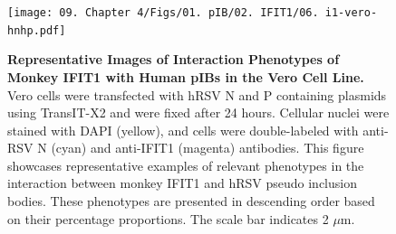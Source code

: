 \begin{figure}
    \centering
    \texttt{[image: 09. Chapter 4/Figs/01. pIB/02. IFIT1/06. i1-vero-hnhp.pdf]}
    \caption[Representative Images of Interaction Phenotypes of Monkey IFIT1 with Human pIBs in the Vero Cell Line.]{\textbf{Representative Images of Interaction Phenotypes of Monkey IFIT1 with Human pIBs in the Vero Cell Line.} Vero cells were transfected with hRSV N and P containing plasmids using TransIT-X2 and were fixed after 24 hours. Cellular nuclei were stained with DAPI (yellow), and cells were double-labeled with anti-RSV N (cyan) and anti-IFIT1 (magenta) antibodies. This figure showcases representative examples of relevant phenotypes in the interaction between monkey IFIT1 and hRSV pseudo inclusion bodies. These phenotypes are presented in descending order based on their percentage proportions. The scale bar indicates 2 \(\mu \mbox{m}\).}
    \label{fig:Representative Images of Interaction Phenotypes of Monkey IFIT1 with Human pIBs in the VERO Cell Line}
\end{figure}

